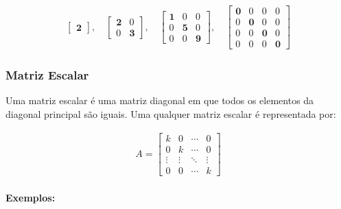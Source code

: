 \[
    \begin{matrix}
        \begin{bmatrix}
            \mathbf{2}
        \end{bmatrix},
        \quad
        \begin{bmatrix}
            \mathbf{2} & 0          \\
            0          & \mathbf{3}
        \end{bmatrix},
        \quad
        \begin{bmatrix}
            \mathbf{1} & 0          & 0          \\
            0          & \mathbf{5} & 0          \\
            0          & 0          & \mathbf{9}
        \end{bmatrix},
        \quad
        \begin{bmatrix}
            \mathbf{0} & 0          & 0          & 0          \\
            0          & \mathbf{0} & 0          & 0          \\
            0          & 0          & \mathbf{0} & 0          \\
            0          & 0          & 0          & \mathbf{0}
        \end{bmatrix}
    \end{matrix}
\]

\subsubsection{Matriz Escalar}
\indent

Uma matriz escalar é uma matriz diagonal em que todos os elementos da diagonal principal são iguais. Uma qualquer matriz escalar é representada por:

\[
    \begin{matrix}
        A = \begin{bmatrix}
                k      & 0      & \cdots & 0      \\
                0      & k      & \cdots & 0      \\
                \vdots & \vdots & \ddots & \vdots \\
                0      & 0      & \cdots & k
            \end{bmatrix}
    \end{matrix}
\]

\paragraph{Exemplos:}

